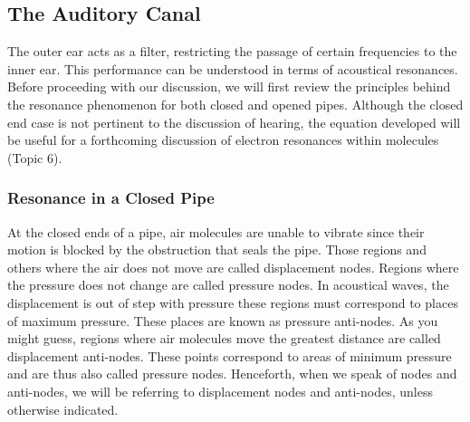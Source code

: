 \subsection{The Auditory Canal}

The outer ear acts as a filter, restricting the passage of certain frequencies to the inner ear.  This performance can be understood in terms of acoustical resonances.  Before proceeding with our discussion, we will first review the principles behind the resonance phenomenon for both closed and opened pipes. Although the closed end case is not pertinent to the discussion of hearing, the equation developed will be useful for a forthcoming discussion of electron resonances within molecules (Topic 6).

\subsubsection{Resonance in a Closed Pipe}

At the closed ends of a pipe, air molecules are unable to vibrate since their motion is blocked by the obstruction that seals the pipe.  Those regions and others where the air does not move are called displacement nodes.  Regions where the pressure does not change are called pressure nodes. In acoustical waves, the displacement is out of step with pressure these regions must correspond to places of maximum pressure. These places are known as pressure anti-nodes.  As you might guess, regions where air molecules move the greatest distance are called displacement anti-nodes.  These points correspond to areas of minimum pressure and are thus also called pressure nodes.  Henceforth, when we speak of nodes and anti-nodes, we will be referring to displacement nodes and anti-nodes, unless otherwise indicated.  

